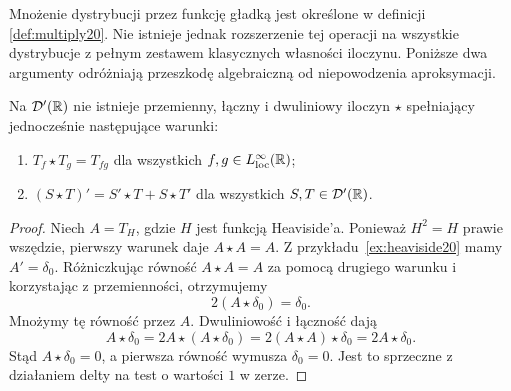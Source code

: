 Mnożenie dystrybucji przez funkcję gładką jest
określone w definicji \ref{def:multiply20}.
Nie istnieje jednak rozszerzenie tej operacji
na wszystkie dystrybucje z pełnym zestawem
klasycznych własności iloczynu. Poniższe dwa
argumenty odróżniają przeszkodę algebraiczną
od niepowodzenia aproksymacji.
\begin{stwierdzenie}
\label{prop:dt-schwartz-obstruction}
Na $\mathcal D'(\mathbb R)$ nie istnieje przemienny, łączny
i dwuliniowy iloczyn $\star$ spełniający jednocześnie
następujące warunki:
\begin{enumerate}
\item $T_f\star T_g=T_{fg}$ dla wszystkich
$f,g\in L^\infty_{\mathrm{loc}}(\mathbb R)$;
\item $(S\star T)'=S'\star T+S\star T'$ dla wszystkich
$S,T\in\mathcal D'(\mathbb R)$.
\end{enumerate}
\end{stwierdzenie}
\begin{proof}
Niech $A=T_H$, gdzie $H$ jest funkcją Heaviside'a.
Ponieważ $H^2=H$ prawie wszędzie, pierwszy warunek
daje $A\star A=A$. Z przykładu~\ref{ex:heaviside20}
mamy $A'=\delta_0$. Różniczkując równość
$A\star A=A$ za pomocą drugiego warunku i korzystając
z przemienności, otrzymujemy
\[
 2(A\star\delta_0)=\delta_0.
\]
Mnożymy tę równość przez $A$. Dwuliniowość i łączność
dają
\[
 A\star\delta_0
 =2A\star(A\star\delta_0)
 =2(A\star A)\star\delta_0
 =2A\star\delta_0.
\]
Stąd $A\star\delta_0=0$, a pierwsza równość
wymusza $\delta_0=0$. Jest to sprzeczne
z działaniem delty na test o wartości $1$ w zerze.
\end{proof}

